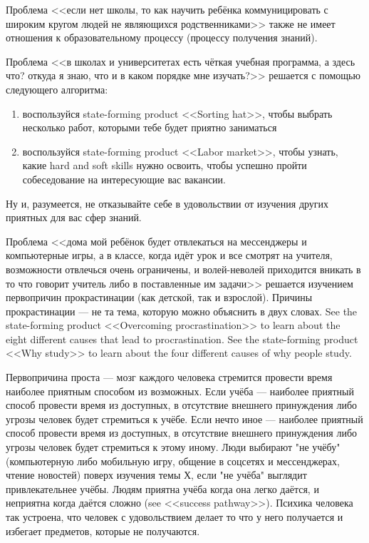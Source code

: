 \documentclass[11pt]{article}
\theoremstyle{remark}
\theoremstyle{definition}
\begin{document}
Проблема <<если нет школы, то как научить ребёнка коммуницировать с широким кругом людей не являющихся родственниками>> также не имеет отношения к образовательному процессу (процессу получения знаний).


Проблема <<в школах и университетах есть чёткая учебная программа, а здесь что? откуда я знаю, что и в каком порядке мне изучать?>> решается с помощью следующего алгоритма:

\begin{enumerate}

\item воспользуйся state-forming product <<Sorting hat>>, чтобы выбрать несколько работ, которыми тебе будет приятно заниматься
\item воспользуйся state-forming product <<Labor market>>, чтобы узнать, какие hard and soft skills нужно освоить, чтобы успешно пройти собеседование на интересующие вас вакансии.

\end{enumerate}

Ну и, разумеется, не отказывайте себе в удовольствии от изучения других приятных для вас сфер знаний.







Проблема <<дома мой ребёнок будет отвлекаться на мессенджеры и компьютерные игры, а в классе, когда идёт урок и все смотрят на учителя, возможности отвлечься очень ограничены, и волей-неволей приходится вникать в то что говорит учитель либо в поставленные им задачи>> решается изучением первопричин прокрастинации (как детской, так и взрослой). Причины прокрастинации --- не та тема, которую можно объяснить в двух словах. See the state-forming product <<Overcoming procrastination>> to learn about the eight different causes that lead to procrastination. See the state-forming product <<Why study>> to learn about the four different causes of why people study. 


Первопричина проста --- мозг каждого человека стремится провести время наиболее приятным способом из возможных. Если учёба --- наиболее приятный способ провести время из доступных, в отсутствие внешнего принуждения либо угрозы человек будет стремиться к учёбе. Если нечто иное --- наиболее приятный способ провести время из доступных, в отсутствие внешнего принуждения либо угрозы человек будет стремиться к этому иному. Люди выбирают "не учёбу" (компьютерную либо мобильную игру, общение в соцсетях и мессенджерах, чтение новостей) поверх изучения темы Х, если "не учёба" выглядит привлекательнее учёбы. Людям приятна учёба когда она легко даётся, и неприятна когда даётся сложно (see <<success pathway>>). Психика человека так устроена, что человек с удовольствием делает то что у него получается и избегает предметов, которые не получаются.
\end{document}
